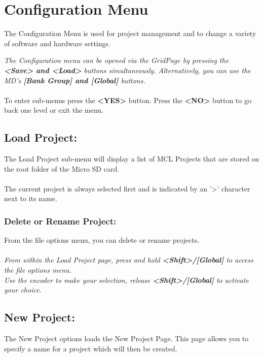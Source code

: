 \chapter{Configuration Menu}
The Configuration Menu is used for project management and to change a variety of software and hardware settings.


\textit{The Configuration menu can be opened via the GridPage by pressing the \textbf{<Save> and <Load>} buttons simultaneously. Alternatively, you can use the MD's \textbf{[Bank Group] and [Global]} buttons.}\\\\
To enter sub-menus press the \textbf{<YES>} button. Press the \textbf{<NO>} button to go back one level or exit the menu.
\section{Load Project:}
The Load Project sub-menu will display a list of MCL Projects that are stored on the root folder of the Micro SD card.\\\\
The current project is always selected first and is indicated by an '>' character next to its name.

\subsection{Delete or Rename Project:}
From the file options menu, you can delete or rename projects.\\\\
\textit{From within the Load Project page, press and hold \textbf{<Shift>/[Global]} to access the file options menu.\\
Use the encoder to make your selection, release \textbf{<Shift>/[Global]} to activate your choice.}

\newpage
\section{New Project:}
The New Project options loads the New Project Page. This page allows you to specify a name for a project which will then be created.\\

